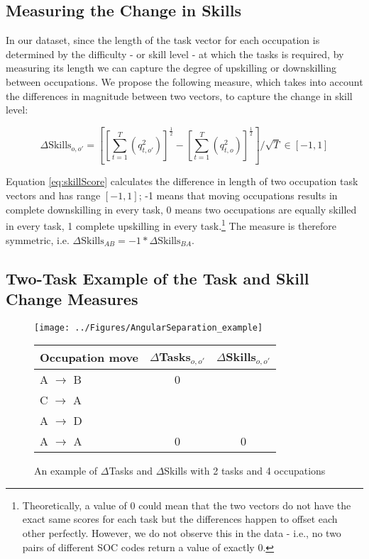 \documentclass[preprint,12pt,authoryear]{elsarticle}
\begin{document}
\subsection{Measuring the Change in Skills}
\label{sec:changeSkillLevel}
In our dataset, since the length of the task vector for each occupation is determined by the difficulty - or skill level - at which the tasks is required, by measuring its length we can capture the degree of upskilling or downskilling between occupations. We propose the following measure, which takes into account the differences in magnitude between two vectors, to capture the change in skill level: 

\begin{equation}
\label{eq:skillScore}
\Delta\text{Skills}_{o,o'} = \left[\left[\sum_{t=1}^{T}(q_{t,o'}^{2})\right]^{\frac{1}{2}} - \left[\sum_{t=1}^{T}(q_{t,o}^{2})\right]^{\frac{1}{2}} \right]/\sqrt{T} \in[-1,1]
\end{equation}


\noindent Equation \ref{eq:skillScore} calculates the difference in length of two occupation task vectors and has range $[-1,1]$; -1 means that moving occupations results in complete downskilling in every task, 0 means two occupations are equally skilled in every task, 1 complete upskilling in every task.\footnote{Theoretically, a value of 0 could mean that the two vectors do not have the exact same scores for each task but the differences happen to offset each other perfectly. However, we do not observe this in the data - i.e., no two pairs of different SOC codes return a value of exactly 0. } The measure is therefore symmetric, i.e. $\Delta\text{Skills}_{{A}{B}}  = -1* \Delta\text{Skills}_{{B}{A}}$.

\subsection{Two-Task Example of the Task and Skill Change Measures}
\label{sec:twoTaskEx}

\begin{figure}[t]
	\centering
	\texttt{[image: ../Figures/AngularSeparation\_example]}
	\qquad
	\begin{tabular}{lcc}
		Occupation move & $\Delta$Tasks$ _{o,o'}$& $\Delta$Skills$_{o,o'}$\\
		\hline
		\hline
		A $\rightarrow$ B & 0 &   \\
		C $\rightarrow$ A &   &   \\
		A $\rightarrow$ D &   &   \\
		A $\rightarrow$ A & 0 & 0 \\
	\end{tabular}
	\caption{An example of $\Delta$Tasks and $\Delta$Skills with 2 tasks and 4 occupations}
	\label{fig:AngSep}
\end{figure}
\end{document}
